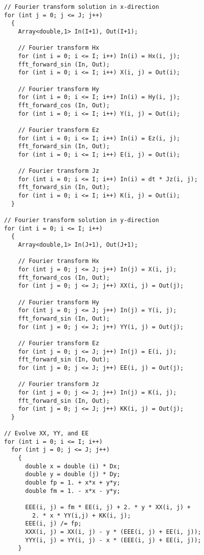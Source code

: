 {\begin{verbatim}
  // Fourier transform solution in x-direction
  for (int j = 0; j <= J; j++)
    {
      Array<double,1> In(I+1), Out(I+1);

      // Fourier transform Hx
      for (int i = 0; i <= I; i++) In(i) = Hx(i, j);
      fft_forward_sin (In, Out);
      for (int i = 0; i <= I; i++) X(i, j) = Out(i);

      // Fourier transform Hy
      for (int i = 0; i <= I; i++) In(i) = Hy(i, j);
      fft_forward_cos (In, Out);
      for (int i = 0; i <= I; i++) Y(i, j) = Out(i);

      // Fourier transform Ez
      for (int i = 0; i <= I; i++) In(i) = Ez(i, j);
      fft_forward_sin (In, Out);
      for (int i = 0; i <= I; i++) E(i, j) = Out(i);

      // Fourier transform Jz
      for (int i = 0; i <= I; i++) In(i) = dt * Jz(i, j);
      fft_forward_sin (In, Out);
      for (int i = 0; i <= I; i++) K(i, j) = Out(i);
    }

  // Fourier transform solution in y-direction
  for (int i = 0; i <= I; i++)
    {
      Array<double,1> In(J+1), Out(J+1);

      // Fourier transform Hx
      for (int j = 0; j <= J; j++) In(j) = X(i, j);
      fft_forward_cos (In, Out);
      for (int j = 0; j <= J; j++) XX(i, j) = Out(j);

      // Fourier transform Hy
      for (int j = 0; j <= J; j++) In(j) = Y(i, j);
      fft_forward_sin (In, Out);
      for (int j = 0; j <= J; j++) YY(i, j) = Out(j);

      // Fourier transform Ez
      for (int j = 0; j <= J; j++) In(j) = E(i, j);
      fft_forward_sin (In, Out);
      for (int j = 0; j <= J; j++) EE(i, j) = Out(j);

      // Fourier transform Jz
      for (int j = 0; j <= J; j++) In(j) = K(i, j);
      fft_forward_sin (In, Out);
      for (int j = 0; j <= J; j++) KK(i, j) = Out(j);
    }
  
  // Evolve XX, YY, and EE
  for (int i = 0; i <= I; i++)
    for (int j = 0; j <= J; j++)
      {
        double x = double (i) * Dx;
        double y = double (j) * Dy;
        double fp = 1. + x*x + y*y;
        double fm = 1. - x*x - y*y;

        EEE(i, j) = fm * EE(i, j) + 2. * y * XX(i, j) +
          2. * x * YY(i,j) + KK(i, j);
        EEE(i, j) /= fp;
        XXX(i, j) = XX(i, j) - y * (EEE(i, j) + EE(i, j));
        YYY(i, j) = YY(i, j) - x * (EEE(i, j) + EE(i, j));  
      }


\end{verbatim}}
